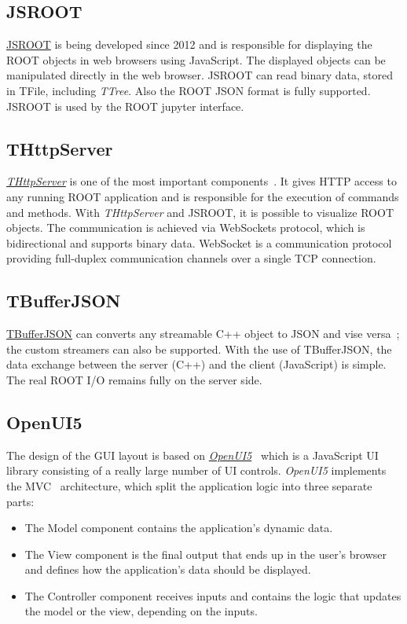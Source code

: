\documentclass[a4paper]{jpconf}
\begin{document}
\subsection{JSROOT}

\href{https://github.com/root-project/jsroot/}{JSROOT} is being developed since
2012 and is responsible for displaying the ROOT objects in web browsers using
JavaScript. The displayed objects can be manipulated directly in
the web browser. JSROOT can read binary data, stored in TFile, including \textit{TTree}.
Also the ROOT JSON format is fully supported. JSROOT is used by the ROOT jupyter interface.

\subsection{THttpServer}

\href{https://github.com/root-project/jsroot/blob/master/docs/HttpServer.md}{{\it THttpServer}} is
one of the most important components~\cite{http}. It gives HTTP access to any running ROOT application
and is responsible for the execution of commands and methods. With {\it THttpServer}
and JSROOT, it is possible to visualize ROOT objects. The communication is achieved
via WebSockets protocol, which is bidirectional and supports binary data. WebSocket
is a communication protocol providing full-duplex communication channels over a
single TCP connection.

\subsection{TBufferJSON}

\href{https://root.cern/doc/master/classTBufferJSON.html}{TBufferJSON} can converts
any streamable C++ object to JSON and vise versa~\cite{buffer}; the custom streamers
can also be supported. With the use of TBufferJSON, the data exchange between the server (C++)
and the client (JavaScript) is simple. The real ROOT I/O remains fully on the server side.

\subsection{OpenUI5}
The design of the GUI layout is based on \textit{\href{https://openui5.hana.ondemand.com/}{OpenUI5}}~\cite{openui}
which is a JavaScript UI library consisting of a really large number of UI controls.
\textit{OpenUI5} implements the MVC~\cite{mvc} architecture, which split
the application logic into three separate parts:
\begin{itemize}
  \item The Model component contains the application's dynamic data.
  \item The View component is the final output that ends up in the user's browser and defines how the application's data should be displayed.
  \item The Controller component receives inputs and contains the logic that updates the model or the view, depending on the inputs.
\end{itemize}
\end{document}

